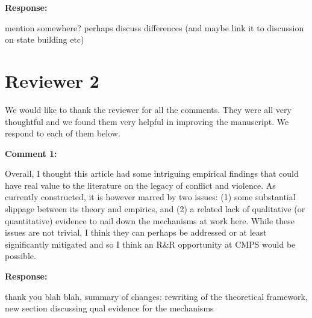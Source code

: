 \documentclass[12pt, a4paper, notitlepage]{article}
\begin{document}
\noindent\textbf{Response:} {}

mention somewhere? perhaps discuss differences (and maybe link it to discussion on state building etc)

\newpage
\section*{Reviewer 2}

\textbf{{\color{red}{CHANGE }}} We would like to thank the reviewer for all the comments. They were all very thoughtful and we found them very helpful in improving the manuscript. We respond to each of them below.

\vspace{15pt}
\noindent\textbf{Comment 1:}
\begin{displayquote}
Overall, I thought this article had some intriguing empirical findings that could have real value to the literature on the legacy of conflict and violence. As currently constructed, it is however marred by two issues: (1) some substantial slippage between its theory and empirics, and (2) a related lack of qualitative (or quantitative) evidence to nail down the mechanisms at work here. While these issues are not trivial, I think they can perhaps be addressed or at least significantly mitigated and so I think an R&R opportunity at CMPS would be possible.
\end{displayquote}

\noindent\textbf{Response:} {}

thank you blah blah, summary of changes: rewriting of the theoretical framework, new section discussing qual evidence for the mechanisms
\end{document}
